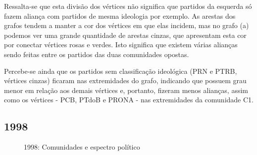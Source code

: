 Ressalta-se que esta divisão dos vértices não significa que partidos da esquerda só fazem aliança com partidos de mesma ideologia por exemplo. As arestas dos grafos tendem a manter a cor dos vértices em que elas incidem, mas no grafo (a) podemos ver uma grande quantidade de arestas cinzas, que apresentam esta cor por conectar vértices rosas e verdes. Isto significa que existem várias alianças sendo feitas entre os partidos das duas comunidades opostas.

Percebe-se ainda que os partidos sem classificação ideológica (\gls{PRN} e \gls{PTRB}, vértices cinzas) ficaram nas extremidades do grafo, indicando que possuem grau menor em relação aos demais vértices e, portanto, fizeram menos alianças, assim como os vértices - \gls{PCB}, \gls{PTdoB} e \gls{PRONA} - nas extremidades da comunidade C1.


\subsection{1998}
\label{resultados__grafos--1998}

\begin{figure}[H]
\center
    \qquad

    \caption{1998: Comunidades e espectro político}
\end{figure}

